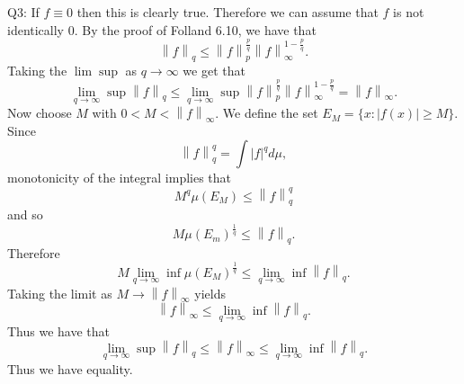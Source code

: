\documentclass[letterpaper]{article}
\newcommand{\norm}[1]{\left\lVert#1\right\rVert}
\begin{document}
Q3: If $f \equiv 0$ then this is clearly true. Therefore we can assume that $f$ is not identically 0. 
By the proof of Folland 6.10, we have that $$\norm{f}_q \leq \norm{f}_p^{\frac{p}{q}} \norm{f}_\infty^{1- \frac{p}{q}}.$$ 
Taking the $\lim \sup$ as $q\to \infty$ we get that $$\lim_{q \to \infty} \sup \norm{f}_q \leq \lim_{q\to \infty} \sup \norm{f}_p^{\frac{p}{q}} \norm{f}_\infty^{1- \frac{p}{q}} = \norm{f}_{\infty}.$$
Now choose $M$ with $0<M < \norm{f}_\infty$. We define the set $E_M = \{x: |f(x)| \geq M\}.$ Since $$\norm{f}_q^q = \int |f|^q d\mu,$$ monotonicity of the integral implies that $$M^q \mu(E_M) \leq \norm{f}_q^q$$
and so $$M \mu(E_m)^{\frac{1}{q}} \leq \norm{f}_q.$$ 
Therefore $$M \lim_{q\to \infty } \inf \mu(E_M)^\frac{1}{q} \leq \lim_{q \to \infty} \inf \norm{f}_q .$$ Taking the limit as $M \to \norm{f}_{\infty}$ yields $$ \norm{f}_\infty \leq \lim_{q\to \infty} \inf \norm{f}_q.$$ Thus we have that $$\lim_{q \to \infty } \sup \norm{f}_q \leq \norm{f}_\infty \leq \lim_{q\to \infty} \inf \norm{f}_q.$$ Thus we have equality. 
\end{document}
